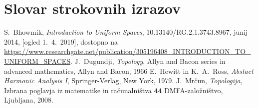 \documentclass[mat1]{fmfdelo}
\begin{document}
\section*{Slovar strokovnih izrazov}


\begin{thebibliography}{99}

S.~Bhowmik, \emph{Introduction to Uniform Spaces}, 10.13140/RG.2.1.3743.8967, junij 2014, [ogled 1.~4.~2019], dostopno na \url{https://www.researchgate.net/publication/305196408_INTRODUCTION_TO_UNIFORM_SPACES}.
J.~Dugundji, \emph{Topology}, Allyn and Bacon series in advanced mathematics, Allyn and Bacon, 1966
E.~Hewitt in K.~A.~Ross, \emph{Abstact Harmonic Analysis I}, Springer-Verlag, New York, 1979.
J.~Mrčun, \emph{Topologija}, Izbrana poglavja iz matematike in računalništva \textbf{44} DMFA-založništvo, Ljubljana, 2008.

\end{thebibliography}
\end{document}
